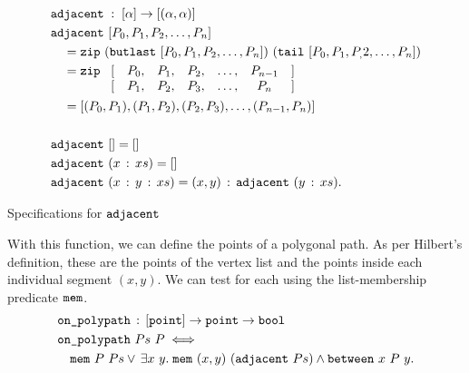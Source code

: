\begin{boxedfigure}
\small
\begin{align*}
  &\code{adjacent}\; : \; [\alpha] \rightarrow [(\alpha,\alpha)]\\
  &\code{adjacent}\ [P_0,P_1,P_2,\ldots,P_n]\\
  &\quad=\code{zip}\ (\code{butlast}\ [P_0,P_1,P_2,\ldots,P_n])\ (\code{tail}\ [P_0,P_1,P_,2,\ldots,P_n])\\
  &\quad= \code{zip}\ \begin{array}[t]{rcccccl}\lbrack & P_0,&P_1,&P_2,&\ldots,&P_{n-1}&\rbrack\\
    \lbrack & P_1,&P_2,&P_3,&\ldots,&P_n&\rbrack
  \end{array}\\
  &\quad= [(P_0,P_1),(P_1,P_2),(P_2,P_3),\ldots,(P_{n-1},P_n)]\\\\
  &\code{adjacent}\ [] = []\\
  &\code{adjacent}\ (\cons{x}{xs}) = []\\
  &\code{adjacent}\ (\cons{x}{\cons{y}{xs}}) = \cons{(x,y)}{\code{adjacent}\ (\cons{y}{xs})}.
\end{align*}
\caption{Specifications for $\texttt{adjacent}$}
\label{fig:AdjacentSpec}
\end{boxedfigure}

With this function, we can define the points of a polygonal path. As per Hilbert's definition, these are the points of the vertex list and the points inside each individual segment $(x,y)$. We can test for each using the list-membership predicate $\texttt{mem}$.
\begin{equation}\label{eq:OnPolyPath}
  \begin{split}
    &\code{on\_polypath}\,:\,[\code{point}] \rightarrow \code{point} \rightarrow \code{bool}\\
    &\code{on\_polypath}\ Ps\ P \iff \\
    &\quad\code{mem}\ P\ Ps\vee\,\exists x\ y.\; \code{mem}\ (x,y)\ (\code{adjacent}\ Ps) \wedge \between{x}{P}{y}.
  \end{split}
\end{equation}


